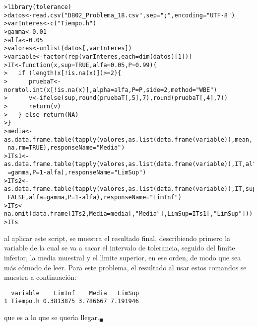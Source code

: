 \begin{solucion}
 \begin{verbatim}
>library(tolerance)
>datos<-read.csv("DB02_Problema_18.csv",sep=";",encoding="UTF-8")
>varInteres<-c("Tiempo.h")
>gamma<-0.01
>alfa<-0.05
>valores<-unlist(datos[,varInteres])
>variable<-factor(rep(varInteres,each=dim(datos)[1]))
>IT<-function(x,sup=TRUE,alfa=0.05,P=0.99){
>   if (length(x[!is.na(x)])>=2){
>      pruebaT<-normtol.int(x[!is.na(x)],alpha=alfa,P=P,side=2,method="WBE")
>      v<-ifelse(sup,round(pruebaT[,5],7),round(pruebaT[,4],7))
>      return(v)
>   } else return(NA)
>}
>media<-as.data.frame.table(tapply(valores,as.list(data.frame(variable)),mean,
 na.rm=TRUE),responseName="Media")
>ITs1<-as.data.frame.table(tapply(valores,as.list(data.frame(variable)),IT,alfa
 =gamma,P=1-alfa),responseName="LimSup")
>ITs2<-as.data.frame.table(tapply(valores,as.list(data.frame(variable)),IT,sup=
 FALSE,alfa=gamma,P=1-alfa),responseName="LimInf")
>ITs<-na.omit(data.frame(ITs2,Media=media[,"Media"],LimSup=ITs1[,"LimSup"]))
>ITs
 \end{verbatim}
 \vspace{-0.5cm}
 al aplicar este script, se muestra el resultado final, describiendo primero la variable de la cual se va a sacar el intervalo de tolerancia, seguido del l\'{\i}mite inferior, la media muestral y el l\'{\i}mite superior, en ese orden, de modo que sea m\'as c\'omodo de leer. Para este problema, el resultado al usar estos comandos se muestra a continuaci\'on:
 \begin{verbatim}
  variable    LimInf    Media   LimSup
1 Tiempo.h 0.3813875 3.786667 7.191946
 \end{verbatim}
 \vspace{-0.5cm}
 que es a lo que se quer\'{\i}a llegar.${}_{\blacksquare}$
\end{solucion}
